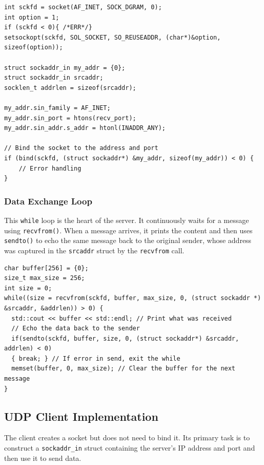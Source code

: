 \documentclass{article}
\begin{document}
\begin{verbatim}
int sckfd = socket(AF_INET, SOCK_DGRAM, 0);
int option = 1;
if (sckfd < 0){ /*ERR*/}
setsockopt(sckfd, SOL_SOCKET, SO_REUSEADDR, (char*)&option, sizeof(option));

struct sockaddr_in my_addr = {0};
struct sockaddr_in srcaddr;
socklen_t addrlen = sizeof(srcaddr);

my_addr.sin_family = AF_INET;
my_addr.sin_port = htons(recv_port);
my_addr.sin_addr.s_addr = htonl(INADDR_ANY);

// Bind the socket to the address and port
if (bind(sckfd, (struct sockaddr*) &my_addr, sizeof(my_addr)) < 0) {
    // Error handling
}
\end{verbatim}

\subsubsection{Data Exchange Loop}

This \texttt{while} loop is the heart of the server. It continuously waits for a message using \texttt{recvfrom()}. When a message arrives, it prints the content and then uses \texttt{sendto()} to echo the same message back to the original sender, whose address was captured in the \texttt{srcaddr} struct by the \texttt{recvfrom} call.

\begin{verbatim}
char buffer[256] = {0};
size_t max_size = 256;
int size = 0;
while((size = recvfrom(sckfd, buffer, max_size, 0, (struct sockaddr *) &srcaddr, &addrlen)) > 0) {
  std::cout << buffer << std::endl; // Print what was received
  // Echo the data back to the sender
  if(sendto(sckfd, buffer, size, 0, (struct sockaddr*) &srcaddr, addrlen) < 0)
  { break; } // If error in send, exit the while
  memset(buffer, 0, max_size); // Clear the buffer for the next message
}
\end{verbatim}

\subsection{UDP Client Implementation}

The client creates a socket but does not need to bind it. Its primary task is to construct a \texttt{sockaddr\_in} struct containing the server's IP address and port and then use it to send data.
\end{document}
